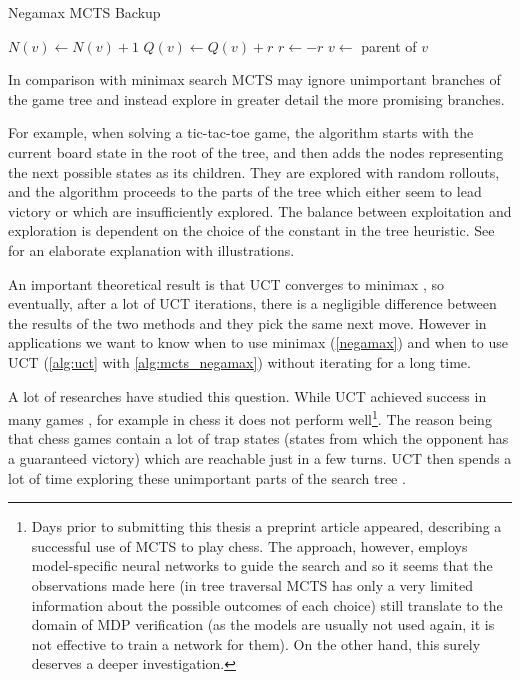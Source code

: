 \begin{algorithm}
\caption{Negamax MCTS Backup}
\label{alg:mcts_negamax}
\begin{algorithmic}[1]
        \State $N(v) \gets N(v) + 1$
        \State $Q(v) \gets Q(v) + r$
        \State $r \gets - r$
        \State $v \gets $ parent of $v$
    \EndWhile
\EndFunction
\end{algorithmic}
\end{algorithm}


In comparison with minimax search MCTS may ignore unimportant
branches of the game tree and instead explore in greater detail the more
promising branches.

For example, when solving a tic-tac-toe game, the algorithm starts with
the current board state in the root of the tree, and then adds
the nodes representing the next possible states as its children.
They are explored with random rollouts, and the algorithm proceeds to
the parts of the tree which either seem to lead victory or which are
insufficiently explored. The balance between exploitation and
exploration is dependent on the choice of the constant in the tree
heuristic. See \parencite{mcts_ttt} for an elaborate explanation with
illustrations.

An important theoretical result is
that UCT converges to minimax \parencite{Kocsis},
so eventually, after a lot of UCT iterations, there is a negligible
difference between the results of the two methods and they pick the same
next move. However in
applications we want to know when to use minimax (\autoref{negamax}) and
when to use UCT (\autoref{alg:uct} with \autoref{alg:mcts_negamax}) without
iterating for a long time.

A lot of researches have studied this question.
While UCT achieved success in many games \parencite{mcts_survey},
for example in chess it does not perform well\footnote{
    Days prior to submitting this thesis a preprint article
    \parencite{alphazero} appeared,
describing a successful use of MCTS to play chess. The approach,
however, employs model-specific neural networks to guide the search and
so it seems that the observations made here (in tree traversal MCTS has
only a very limited information about the possible outcomes of each
choice) still translate to the domain of MDP
verification (as the models are usually not used again, it is not
effective to train a network for them). On the other hand, this surely
deserves a deeper investigation.}. The reason being that chess
games contain a lot of trap states (states from which the opponent
has a guaranteed victory) which are reachable just in a few turns. UCT
then spends a lot of time exploring these unimportant parts of the search
tree \parencite{mcts_vs_chess}.

